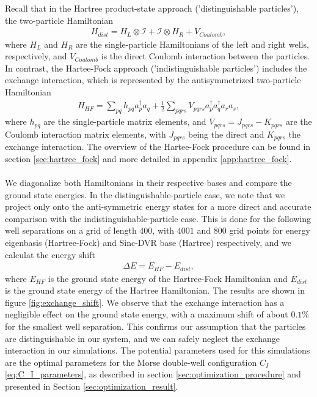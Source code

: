 \documentclass{subfiles}
\begin{document}
Recall that in the Hartree product-state approach ('distinguishable particles'), the two-particle Hamiltonian
\begin{align*}
    H_{dist} = H_L \otimes \mathcal{I} + \mathcal{I} \otimes H_R + V_{Coulomb},
\end{align*}
where $H_L$ and $H_R$ are the single-particle Hamiltonians of the left and right wells, respectively, and $V_{Coulomb}$ is the direct Coulomb interaction between the particles. In contrast, the Hartee-Fock approach ('indistinguishable particles') includes the exchange interaction, which is represented by the antisymmetrized two-particle Hamiltonian
\begin{align*}
    H_{HF} = \sum_{pq} h_{pq} a_p^\dagger a_q + \frac{1}{2} \sum_{pqrs} V_{pqrs} a_p^\dagger a_q^\dagger a_r a_s,
\end{align*}
where $h_{pq}$ are the single-particle matrix elements, and $V_{pqrs} = J_{pqrs} - K_{pqrs}$ are the Coulomb interaction matrix elements, with $J_{pqrs}$ being the direct and $K_{pqrs}$ the exchange interaction. The overview of the Hartee-Fock procedure can be found in section \ref{sec:hartree_fock} and more detailed in appendix \ref{app:hartree_fock}. \\\\
We diagonalize both Hamiltonians in their respective bases and compare the ground state energies. In the distinguishable-particle case, we note that we project only onto the anti-symmetric energy states for a more direct and accurate comparison with the indistinguishable-particle case. This is done for the following well separations on a grid of length $400$, with $4001$ and $800$ grid points for energy eigenbasis (Hartree-Fock) and Sinc-DVR base (Hartree) respectively, and we calculat the energy shift
\begin{align*}
    \Delta E = E_{HF} - E_{dist},
\end{align*}
where $E_{HF}$ is the ground state energy of the Hartree-Fock Hamiltonian and $E_{dist}$ is the ground state energy of the Hartree Hamiltonian. The results are shown in figure \ref{fig:exchange_shift}. We observe that the exchange interaction has a negligible effect on the ground state energy, with a maximum shift of about $0.1\%$ for the smallest well separation. This confirms our assumption that the particles are distinguishable in our system, and we can safely neglect the exchange interaction in our simulations. The potential parameters used for this simulations are the optimal parameters for the Morse double-well configuration $C_I$ \eqref{eq:C_I_parameters}, as described in section \ref{sec:optimization_procedure} and presented in Section \ref{sec:optimization_result}.
\end{document}
